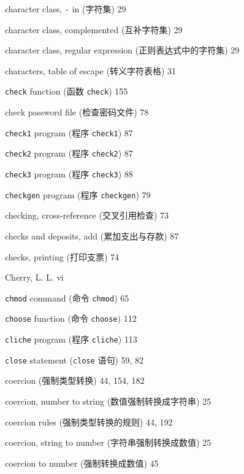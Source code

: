 \begin{multicols}{3}
\hangindent=3pc  character class, \verb'-' in (字符集) 29

\hangindent=3pc  character class, complemented (互补字符集) 29

\hangindent=3pc  character class, regular expression
(正则表达式中的字符集) 29

\hangindent=3pc  characters, table of escape (转义字符表格) 31

\hangindent=3pc  \verb'check' function (函数 \verb'check') 155

\hangindent=3pc  check password file (检查密码文件) 78

\hangindent=3pc  \verb'check1' program (程序 \verb'check1') 87

\hangindent=3pc  \verb'check2' program (程序 \verb'check2') 87

\hangindent=3pc  \verb'check3' program (程序 \verb'check3') 88

\hangindent=3pc  \verb'checkgen' program (程序 \verb'checkgen') 79

\hangindent=3pc  checking, cross-reference (交叉引用检查) 73

\hangindent=3pc  checks and deposits, add (累加支出与存款) 87

\hangindent=3pc  checks, printing (打印支票) 74

\hangindent=3pc  Cherry, L. L. vi

\hangindent=3pc  \verb'chmod' command (命令 \verb'chmod') 65

\hangindent=3pc  \verb'choose' function (命令 \verb'choose') 112

\hangindent=3pc  \verb'cliche' program (程序 \verb'cliche') 113

\hangindent=3pc  \verb'close' statement (\verb'close' 语句) 59, 82

\hangindent=3pc  coercion (强制类型转换) 44, 154, 182

\hangindent=3pc  coercion, number to string
(数值强制转换成字符串) 25

\hangindent=3pc  coercion rules (强制类型转换的规则) 44, 192

\hangindent=3pc  coercion, string to number
(字符串强制转换成数值) 25

\hangindent=3pc  coercion to number (强制转换成数值) 45


\end{multicols}
